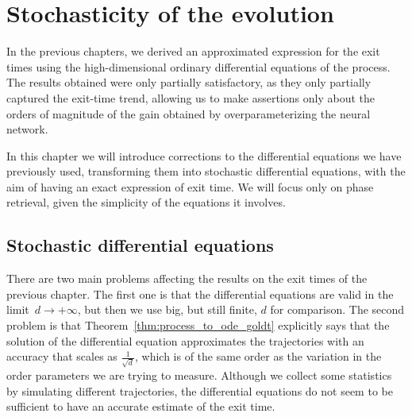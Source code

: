 \chapter{Stochasticity of the evolution}
In the previous chapters, we derived an approximated expression for the exit times using the high-dimensional
ordinary differential equations of the process.
The results obtained were only partially satisfactory, as they only partially captured the exit-time trend,
allowing us to make assertions only about the orders of magnitude of the gain obtained by overparameterizing the neural network.

In this chapter we will introduce corrections to the differential equations we have previously used,
transforming them into stochastic differential equations, with the aim of having an exact expression of exit time.
We will focus only on phase retrieval, given the simplicity of the equations it involves. 

\section{Stochastic differential equations}
There are two main problems affecting the results on the exit times of the previous chapter.
The first one is that the differential equations are valid in the limit~\(d\to+\infty\),
but then we use big, but still finite, \(d\) for comparison. 
The second problem is that Theorem~\ref{thm:process_to_ode_goldt} explicitly says that the solution of the differential equation approximates the trajectories with an accuracy that scales as \(\frac{1}{\sqrt{d}}\),
which is of the same order as the variation in the order parameters we are trying to measure.
Although we collect some statistics by simulating different trajectories,
the differential equations do not seem to be sufficient to have an accurate estimate of the exit time.

